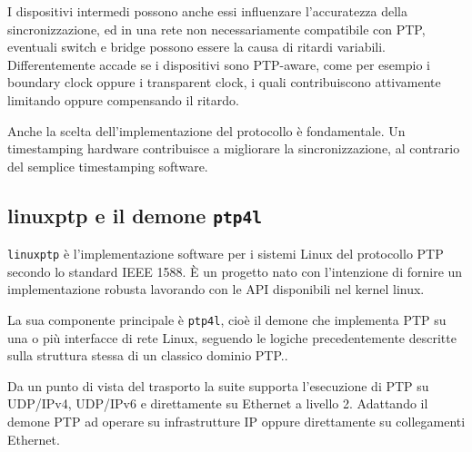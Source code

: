 I dispositivi intermedi possono anche essi influenzare l'accuratezza della sincronizzazione, ed
in una rete non necessariamente compatibile con PTP, eventuali switch e bridge possono essere 
la causa di ritardi variabili. Differentemente accade se i dispositivi sono PTP-aware, come 
per esempio i boundary clock oppure i transparent clock, i quali contribuiscono attivamente limitando
oppure compensando il ritardo.

Anche la scelta dell'implementazione del protocollo è fondamentale. Un timestamping
hardware contribuisce a migliorare la sincronizzazione, al contrario del semplice
timestamping software.

\subsection{linuxptp e il demone \texttt{ptp4l}}
\label{subsec:linuxptp_ptp4l}

\texttt{linuxptp} è l'implementazione software per i sistemi Linux del protocollo PTP
secondo lo standard IEEE 1588. È un progetto nato con l'intenzione di fornire un implementazione
robusta lavorando con le API disponibili nel kernel linux.

La sua componente principale è \texttt{ptp4l}, cioè il demone che implementa PTP su 
una o più interfacce di rete Linux, seguendo le logiche precedentemente descritte sulla 
struttura stessa di un classico dominio PTP.\cite{PrecisionTimeProtocol2026}.

Da un punto di vista del trasporto la suite supporta l'esecuzione di PTP
su UDP/IPv4, UDP/IPv6 e direttamente su Ethernet a livello 2.
Adattando il demone PTP ad operare su infrastrutture IP oppure direttamente 
su collegamenti Ethernet\cite{IEEEStandardPrecision2020}.